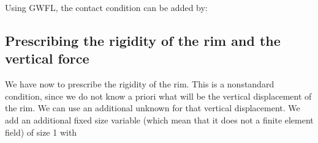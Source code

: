 \documentclass[a4paper,11pt,english]{sphinxmanual}
\begin{document}
Using GWFL, the contact condition can be added by:

\begin{sphinxVerbatim}[commandchars=\\\{\}]
 \PYG{p}{[}\PYG{p}{]}
  
 
                     
 
           
\end{sphinxVerbatim}


\subsection{Prescribing the rigidity of the rim and the vertical force}
\label{\detokenize{tutorial/wheel:prescribing-the-rigidity-of-the-rim-and-the-vertical-force}}
We have now to prescribe the rigidity of the rim. This is a non\sphinxhyphen{}standard condition, since we do not know a priori what will be the vertical displacement of the rim. We can use an additional unknown for that vertical displacement. We add an additional fixed size variable  (which mean that it does not a finite element field) of size 1 with

\begin{sphinxVerbatim}[commandchars=\\\{\}]
 
\end{sphinxVerbatim}
\end{document}
